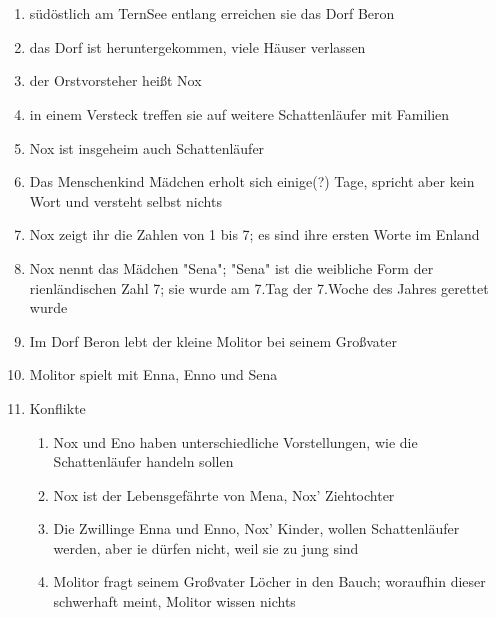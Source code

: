 \documentclass[12pt,a4paper,onecolumn,twoside,ngerman]{book}
\newcommand{\Tern}{Tern}
\newcommand{\Beron}{Beron}
\newcommand{\Molitor}{Molitor}
\newcommand{\Sena}{Sena}
\newcommand{\Enland}{Enland}
\newcommand{\Schattenlaufer}{Schattenläufer}
\newcommand{\Eno}{Eno}
\newcommand{\Nox}{Nox}
\newcommand{\Mena}{Mena}
\newcommand{\Enna}{Enna}
\newcommand{\Enno}{Enno}
\begin{document}
\section[Im Nest]{}
\begin{enumerate}
  \item südöstlich am {\Tern}See entlang erreichen sie das Dorf {\Beron}
  \item das Dorf ist heruntergekommen, viele Häuser verlassen
  \item der Orstvorsteher heißt {\Nox}
  \item in einem Versteck treffen sie auf weitere {\Schattenlaufer} mit Familien
  \item {\Nox} ist insgeheim auch {\Schattenlaufer}
  \item Das Menschenkind Mädchen erholt sich einige(?) Tage, spricht aber kein Wort und versteht selbst nichts
  \item {\Nox} zeigt ihr die Zahlen von 1 bis 7; es sind ihre ersten Worte im {\Enland}
  \item {\Nox} nennt das Mädchen "{\Sena}"; "{\Sena}"{ }ist die weibliche Form der rienländischen Zahl 7; sie wurde am 7.Tag der 7.Woche des Jahres gerettet wurde
  \item Im Dorf {\Beron} lebt der kleine {\Molitor} bei seinem Großvater
  \item {\Molitor} spielt mit {\Enna}, {\Enno} und {\Sena}
  \item Konflikte
  \begin{enumerate}
    \item {\Nox} und {\Eno} haben unterschiedliche Vorstellungen, wie die {\Schattenlaufer} handeln sollen
    \item {\Nox} ist der Lebensgefährte von {\Mena}, {\Nox}' Ziehtochter
    \item Die Zwillinge {\Enna} und {\Enno}, {\Nox}' Kinder, wollen {\Schattenlaufer} werden, aber ie dürfen nicht, weil sie zu jung sind
    \item {\Molitor} fragt seinem Großvater Löcher in den Bauch; woraufhin dieser schwerhaft meint, {\Molitor} wissen nichts
  \end{enumerate}
\end{enumerate}
\end{document}

